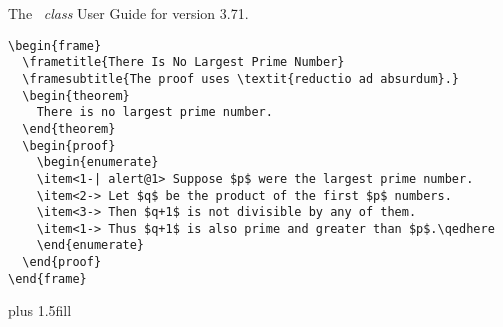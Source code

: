 \documentclass[doc2]{ltxdoc}
\def\beamerugversion{3.71}
\begin{document}
{
\qquad
\parindent 0pt
\vbox{\Huge
The \beamer\ \textit{class}
\Large
User Guide for version \beamerugversion.}
\vskip 3cm




\normalsize
\begin{verbatim}
\begin{frame}
  \frametitle{There Is No Largest Prime Number}
  \framesubtitle{The proof uses \textit{reductio ad absurdum}.}
  \begin{theorem}
    There is no largest prime number.
  \end{theorem}
  \begin{proof}
    \begin{enumerate}
    \item<1-| alert@1> Suppose $p$ were the largest prime number.
    \item<2-> Let $q$ be the product of the first $p$ numbers.
    \item<3-> Then $q+1$ is not divisible by any of them.
    \item<1-> Thus $q+1$ is also prime and greater than $p$.\qedhere
    \end{enumerate}
  \end{proof}
\end{frame}
\end{verbatim}
\qquad{}
\vskip 0cm plus 1.5fill
\vbox{}
\clearpage
}
\end{document}
